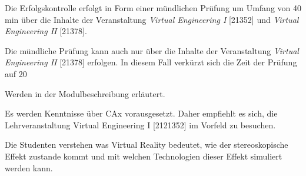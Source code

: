 \begin{course}

\setdoclanguagegerman
{}
\coursecoordination{}



\coursehead


\label{cour_7507.dp_997}


\begin{styleenv}
\begin{assessment}
Die Erfolgskontrolle erfolgt in Form einer mündlichen Prüfung um Umfang von 40 min über die Inhalte der Veranstaltung \emph{Virtual Engineering I} [21352] und \emph{Virtual Engineering II} [21378].

 

Die mündliche Prüfung kann auch nur über die Inhalte der Veranstaltung \emph{Virtual Engineering II} [21378] erfolgen. In diesem Fall verkürzt sich die Zeit der Prüfung auf 20


\end{assessment}

\begin{conditions}Werden in der Modulbeschreibung erläutert.

\end{conditions}

\begin{recommendations}Es werden Kenntnisse über CAx vorausgesetzt. Daher empfiehlt es sich, die Lehrveranstaltung Virtual Engineering I [2121352] im Vorfeld zu besuchen.

\end{recommendations}
\end{styleenv}

\begin{learningoutcomes}
Die Studenten verstehen was Virtual Reality bedeutet, wie der stereoskopische Effekt zustande kommt und mit welchen Technologien dieser Effekt simuliert werden kann.


\end{learningoutcomes}
\end{course}
